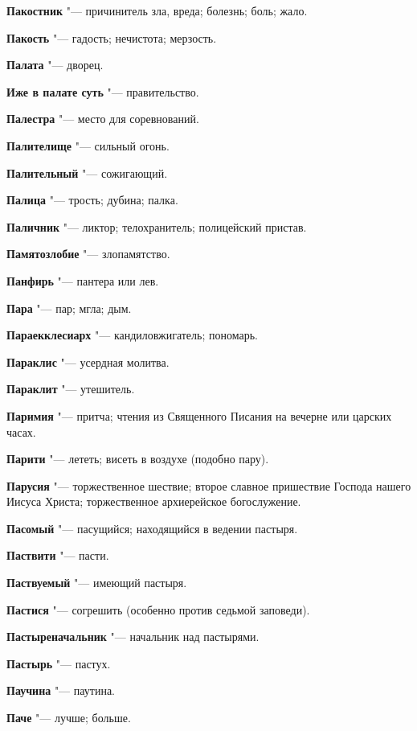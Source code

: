\begin{mymulticols}
\noindent\textbf{Пакостник} "--- причинитель зла, вреда; болезнь; боль; жало. 

\noindent\textbf{Пакость} "--- гадость; нечистота; мерзость. 

\noindent\textbf{Палата} "--- дворец. 

\noindent\textbf{Иже в палате суть} "--- правительство. 

\noindent\textbf{Палестра} "--- место для соревнований. 

\noindent\textbf{Палителище} "--- сильный огонь. 

\noindent\textbf{Палительный} "--- сожигающий. 

\noindent\textbf{Палица} "--- трость; дубина; палка. 

\noindent\textbf{Паличник} "--- ликтор; телохранитель; полицейский пристав. 

\noindent\textbf{Памятозлобие} "--- злопамятство. 

\noindent\textbf{Панфирь} "--- пантера или лев. 

\noindent\textbf{Пара} "--- пар; мгла; дым. 

\noindent\textbf{Параекклесиарх} "--- кандиловжигатель; пономарь. 

\noindent\textbf{Параклис} "--- усердная молитва. 

\noindent\textbf{Параклит} "--- утешитель. 

\noindent\textbf{Паримия} "--- притча; чтения из Священного Писания на вечерне или царских часах. 

\noindent\textbf{Парити} "--- лететь; висеть в воздухе (подобно пару). 

\noindent\textbf{Парусия} "--- торжественное шествие; второе славное пришествие Господа нашего Иисуса Христа; торжественное архиерейское богослужение. 

\noindent\textbf{Пасомый} "--- пасущийся; находящийся в ведении пастыря. 

\noindent\textbf{Паствити} "--- пасти. 

\noindent\textbf{Паствуемый} "--- имеющий пастыря. 

\noindent\textbf{Пастися} "--- согрешить (особенно против седьмой заповеди). 

\noindent\textbf{Пастыреначальник} "--- начальник над пастырями. 

\noindent\textbf{Пастырь} "--- пастух. 

\noindent\textbf{Паучина} "--- паутина. 

\noindent\textbf{Паче} "--- лучше; больше. 


\end{mymulticols}
